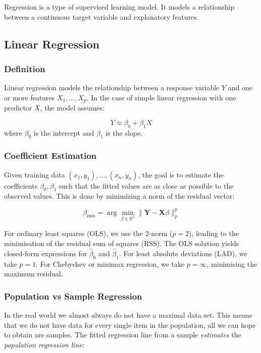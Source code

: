 \documentclass[9pt]{extarticle}
\begin{document}
Regression is a type of supervised learning model. It models a relationship between 
a continuous target variable and explanatory features.
\subsection{Linear Regression}


\subsubsection*{Definition}

Linear regression models the relationship between a response variable $Y$ and one or more features $X_1, \dots, X_p$. In the case of simple linear regression with one predictor $X$, the model assumes:

\[
Y \approx \beta_0 + \beta_1 X
\]
where $\beta_0$ is the intercept and $\beta_1$ is the slope.

\subsubsection*{Coefficient Estimation}

Given training data $(x_1, y_1), \dots, (x_n, y_n)$, the goal is to estimate the coefficients $\beta_0, \beta_1$ such that the fitted values are as close as possible to the observed values. This is done by minimizing a norm of the residual vector:

\[
\beta_{\text{min}} = \arg\min_{\beta \in \mathbb{R}^2} \| \mathbf{Y} - \mathbf{X} \beta \|_p^p
\]

For ordinary least squares (OLS), we use the $2$-norm ($p=2$), 
leading to the minimisation of the residual sum of squares (RSS). 
The OLS solution yields closed-form expressions for $\hat{\beta}_0$ and 
$\hat{\beta}_1$.
 For least absolute deviations (LAD), we take $p = 1$. 
 For Chebyshev or minimax regression, we take $p = \infty$, minimising the maximum residual.


\subsubsection*{Population vs Sample Regression}

In the real world we almost always do not have a maximal data set. 
This means that we do not have data for every single item in the population, 
all we can hope to obtain are samples. 
The fitted regression line from a 
sample \textit{estimates} the \emph{population regression line}:
\end{document}
